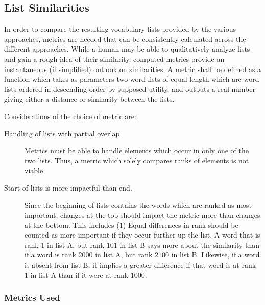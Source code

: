 \subsection{List Similarities}
In order to compare the resulting vocabulary lists provided by the various approaches, metrics are needed that can be consistently calculated across the different approaches.
While a human may be able to qualitatively analyze lists and gain a rough idea of their similarity, computed metrics provide an instantaneous (if simplified) outlook on similarities.
A metric shall be defined as a function which takes as parameters two word lists of equal length which are word lists ordered in descending order by supposed utility, and outputs a real number giving either a distance or similarity between the lists.

Considerations of the choice of metric are:

\begin{description}
	\item [Handling of lists with partial overlap.]
	      Metrics must be able to handle elements which occur in only one of the two lists.
	      Thus, a metric which solely compares ranks of elements is not viable.
	\item [Start of lists is more impactful than end.]
	      Since the beginning of lists contains the words which are ranked as most important, changes at the top should impact the metric more than changes at the bottom. This includes (1) Equal differences in rank should be counted as more important if they occur further up the list.
	      A word that is rank 1 in list A, but rank 101 in list B says more about the similarity than if a word is rank 2000 in list A, but rank 2100 in list B. Likewise, if a word is absent from list B, it implies a greater difference if that word is at rank 1 in list A than if it were at rank 1000.
\end{description}

\subsubsection{Metrics Used}


